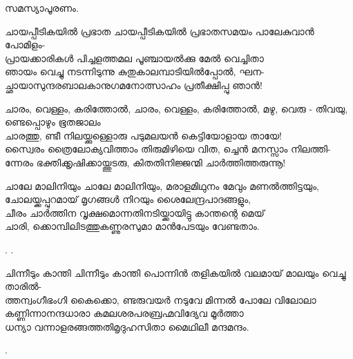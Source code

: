 \begin{enumerate}
സമസ്യാപൂരണം. 



\begin{slokam}{\VSv}{\VKG}{ചായപ്പീടികയിൽ പ്രഭാത}
ചായപ്പീടികയിൽ പ്രഭാതസമയം പാലേകുവാൻ പോമിളം-\\
പ്രായക്കാരികൾ പിച്ചളത്തമല പൂഞ്ചായൽക്കു മേൽ വെച്ചിതാ\\
ഞായം വെച്ചു നടന്നിടുന്നു കുതുകാലമ്പാടിയിൽപ്പോൽ, ഘന-\\
ച്ഛായാസുന്ദരബാലകാനുഗമനോത്സാഹം പ്രതീക്ഷിപ്പു ഞാൻ! 
\end{slokam}


\begin{slokam}{\VSr}{\VNM}{ചാരം, വെള്ളം, കരിത്തോൽ,}
ചാരം, വെള്ളം, കരിത്തോൽ, മഴു, വെരു - തിവയു, ണ്ടെപ്പൊഴും ഭൂതജാലം \\
ചാരത്തു, ണ്ടീ നിലയ്ക്കുള്ളൊരു പടുമലയൻ കെട്ടിയോളായ തായേ! \\
സ്വൈരം ത്രൈലോക്യവിത്താം തിരുമിഴിയെ വിത, ച്ചെൻ മനസ്സാം നിലത്തി-\\
ന്നേരം ഭക്തിക്കൃഷിക്കായ്ത്തുടരു, കിതതിനിജ്ജന്മി ചാർത്തിത്തരുന്നൂ!
\end{slokam}


\begin{slokam}{\VSv}{\ARRV}{ചാലേ മാലിനിയും}
ചാലേ മാലിനിയും, മരാളമിഥുനം മേവും മണല്‍ത്തിട്ടയും,\\
ചോലയ്ക്കപ്പുറമായ്‌ മൃഗങ്ങള്‍ നിറയും ശൈലേന്ദ്രപാദങ്ങളും,\\
ചീരം ചാര്‍ത്തിന വൃക്ഷമൊന്നതിനടിയ്ക്കായിട്ടു കാന്തന്റെ മെയ്‌\\
ചാരി, ക്കൊമ്പിലിടത്തുകണ്ണുരസുമാ മാന്‍പേടയും വേണ്ടതാം.
\end{slokam}


. .

\begin{slokam}{\VSr}{\Punam}{ചിന്നീടും കാന്തി}
ചിന്നീടും കാന്തി പൊന്നിൻ തളികയിൽ വലമായ് മാലയും വെച്ചു താരിൽ-\\ 
ത്തന്വംഗീഭംഗി കൈക്കൊ, ണ്ടരുവയർ നടുവേ മിന്നൽ പോലേ വിലോലാ \\
കണ്ണിന്നാനന്ദധാരാ കമലശരപരബ്രഹ്മവിദ്യേവ മൂർത്താ \\
ധന്യാ വന്നാളരങ്ങത്തതിമൃദുഹസിതാ മൈഥിലീ മന്ദമന്ദം. 
\end{slokam}



.


\end{enumerate}
